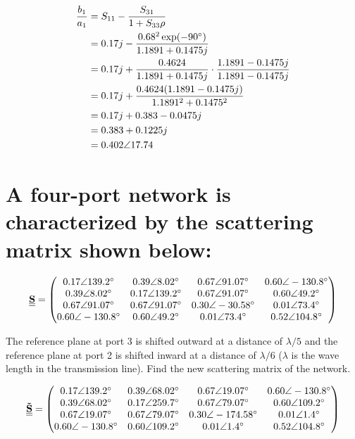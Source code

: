 \documentclass[12pt, letterpaper]{article}
\begin{document}
\begin{itemize}
  \begin{align}
    {b_1\over a_1}&=S_{11}-{ S_{31}\over1+S_{33}\rho}\\
    &=0.17j-{0.68^2\exp(-90^{\circ})\over1.1891+0.1475j}\\
    &=0.17j+{0.4624\over1.1891+0.1475j}\cdot{1.1891-0.1475j\over1.1891-0.1475j}\\
    &=0.17j+{0.4624(1.1891-0.1475j)\over1.1891^2+0.1475^2}\\
    &=0.17j+0.383-0.0475j\\
    &=0.383+0.1225j\\
    &=0.402\angle17.74
  \end{align}
\end{itemize}

\section{A four-port network is characterized by the scattering matrix shown below:}

\begin{align}
  \underline{\underline{\vb{S}}}=
  \begin{pmatrix}
    0.17\angle139.2^{\circ} & 0.39\angle8.02^{\circ} & 0.67\angle91.07^{\circ} & 0.60\angle-130.8^{\circ} \\
    0.39\angle8.02^{\circ} & 0.17\angle139.2^{\circ} & 0.67\angle91.07^{\circ} & 0.60\angle49.2^{\circ} \\
    0.67\angle91.07^{\circ} & 0.67\angle91.07^{\circ} & 0.30\angle-30.58^{\circ} & 0.01\angle73.4^{\circ} \\
    0.60\angle-130.8^{\circ} & 0.60\angle49.2^{\circ} & 0.01\angle73.4^{\circ} & 0.52\angle104.8^{\circ} \\
  \end{pmatrix}
\end{align}

The reference plane at port 3 is shifted outward at a distance of $\lambda/5$ and the reference plane at port 2 is shifted inward at a distance of $\lambda/6$ ($\lambda$ is the wave length in the transmission line). Find the new scattering matrix of the network.

\begin{align}
  \underline{\underline{\vb{\tilde{S}}}}=
  \begin{pmatrix}
    0.17\angle139.2^{\circ} & 0.39\angle68.02^{\circ} & 0.67\angle19.07^{\circ} & 0.60\angle-130.8^{\circ} \\
    0.39\angle68.02^{\circ} & 0.17\angle259.7^{\circ} & 0.67\angle79.07^{\circ} & 0.60\angle109.2^{\circ} \\
    0.67\angle19.07^{\circ} & 0.67\angle79.07^{\circ} & 0.30\angle-174.58^{\circ} & 0.01\angle1.4^{\circ} \\
    0.60\angle-130.8^{\circ} & 0.60\angle109.2^{\circ} & 0.01\angle1.4^{\circ} & 0.52\angle104.8^{\circ} \\
  \end{pmatrix}
\end{align}
\end{document}
